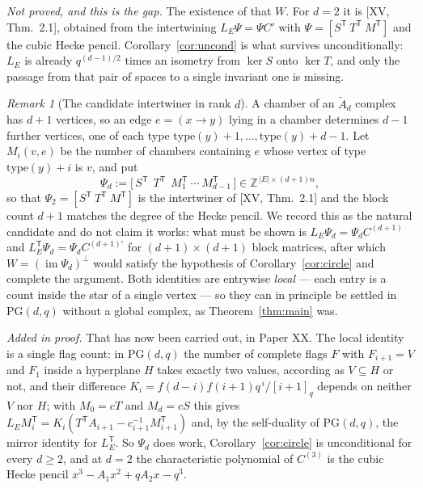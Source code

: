 \documentclass[11pt]{amsart}
\numberwithin{equation}{section}
\theoremstyle{definition}
\theoremstyle{remark}
\newtheorem{remark}[theorem]{Remark}
\newcommand{\Z}{\mathbb{Z}}
\newcommand{\Atilde}[1]{\widetilde A_{#1}}
\newcommand{\LE}{L_{E}}
\newcommand{\PG}{\mathrm{PG}}
\begin{document}
\emph{Not proved, and this is the gap.} The existence of that $W$. For $d=2$ it is
[XV, Thm.~2.1], obtained from the intertwining $\LE\Psi=\Psi C'$ with
$\Psi=[S^{\mathsf T}\ T^{\mathsf T}\ M^{\mathsf T}]$ and the cubic Hecke pencil.
Corollary~\ref{cor:uncond} is what survives unconditionally: $\LE$ is already
$q^{(d-1)/2}$ times an isometry from $\ker S$ onto $\ker T$, and only the passage from
that pair of spaces to a single invariant one is missing.

\begin{remark}[The candidate intertwiner in rank $d$]\label{rem:psi}
A chamber of an $\Atilde d$ complex has $d+1$ vertices, so an edge $e=(x\to y)$ lying in a
chamber determines $d-1$ further vertices, one of each type
$\mathrm{type}(y)+1,\dots,\mathrm{type}(y)+d-1$. Let $M_i(v,e)$ be the number of chambers
containing $e$ whose vertex of type $\mathrm{type}(y)+i$ is $v$, and put
\[
\Psi_d:=\bigl[\,S^{\mathsf T}\ \ T^{\mathsf T}\ \ M_1^{\mathsf T}\ \cdots\
M_{d-1}^{\mathsf T}\,\bigr]\in\Z^{\,|E|\times(d+1)n},
\]
so that $\Psi_2=[S^{\mathsf T}\ T^{\mathsf T}\ M^{\mathsf T}]$ is the intertwiner of
[XV, Thm.~2.1] and the block count $d+1$ matches the degree of the Hecke pencil. We record
this as the natural candidate and do not claim it works: what must be shown is
$\LE\Psi_d=\Psi_dC^{(d+1)}$ and $\LE^{\mathsf T}\Psi_d=\Psi_dC^{(d+1)\prime}$ for
$(d+1)\times(d+1)$ block matrices, after which $W=(\operatorname{im}\Psi_d)^{\perp}$ would
satisfy the hypothesis of Corollary~\ref{cor:circle} and complete the argument. Both
identities are entrywise \emph{local} --- each entry is a count inside the star of a single
vertex --- so they can in principle be settled in $\PG(d,q)$ without a global complex, as
Theorem~\ref{thm:main} was.

\emph{Added in proof.} That has now been carried out, in Paper XX. The local identity is a
single flag count: in $\PG(d,q)$ the number of complete flags $F$ with $F_{i+1}=V$ and $F_1$
inside a hyperplane $H$ takes exactly two values, according as $V\subseteq H$ or not, and
their difference $K_i=f(d-i)f(i+1)q^{\,i}/[i+1]_q$ depends on neither $V$ nor $H$; with
$M_0=cT$ and $M_d=cS$ this gives
$\LE M_i^{\mathsf T}=K_i(T^{\mathsf T}A_{i+1}-c_{i+1}^{-1}M_{i+1}^{\mathsf T})$ and, by the
self-duality of $\PG(d,q)$, the mirror identity for $\LE^{\mathsf T}$. So $\Psi_d$ does work,
Corollary~\ref{cor:circle} is unconditional for every $d\ge2$, and at $d=2$ the
characteristic polynomial of $C^{(3)}$ is the cubic Hecke pencil $x^3-A_1x^2+qA_2x-q^3$.
\end{remark}
\end{document}
